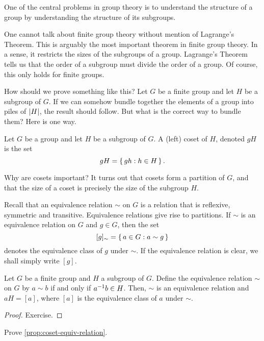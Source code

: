 \documentclass[./main.tex]{subfiles}
\begin{document}
One of the central problems in group theory is to understand the structure of a
group by understanding the structure of its subgroups. 

One cannot talk about finite group theory without mention of Lagrange's Theorem.
This is arguably the most important theorem in finite group theory. In a sense,
it restricts the sizes of the subgroups of a group. Lagrange's Theorem tells us
that the order of a subgroup must divide the order of a group. Of course, this
only holds for finite groups. 

How should we prove something like this? Let $G$ be a finite group and let $H$
be a subgroup of $G$. If we can somehow bundle together the elements of a group
into piles of $\abs{H}$, the result should follow. But what is the correct way
to bundle them? Here is one way.

\begin{definition}[Coset]
\label{def:coset}
Let $G$ be a group and let $H$ be a subgroup of $G$. A (left) coset of $H$,
denoted $gH$ is the set 
\[
    gH = \set{gh: h \in H}.
\]
\end{definition}

Why are cosets important? It turns out that cosets form a partition of $G$, and
that the size of a coset is precisely the size of the subgroup $H$. 

Recall that an equivalence relation $\sim$ on $G$ is a relation that is
reflexive, symmetric and transitive. Equivalence relations give rise to
partitions. If $\sim$ is an equivalence relation on $G$ and $g \in G$, then the
set 
\[
    [g]_\sim = \set{a \in G: a \sim g}
\]
denotes the equivalence class of $g$ under $\sim$. If the equivalence
relation is clear, we shall simply write $[g]$.
\begin{proposition}
\label{prop:coset-equiv-relation}
    Let $G$ be a finite group and $H$ a subgroup of $G$. Define the equivalence
    relation $\sim$ on $G$ by $a \sim b$ if and only if $a^{-1} b \in H$. Then,
    $\sim$ is an equivalence relation and $aH = [a]$, where $[a]$ is the
    equivalence class of $a$ under $\sim$.
\end{proposition}
\begin{proof}
    Exercise.
\end{proof}
\begin{exercise}
    Prove \cref{prop:coset-equiv-relation}.
\end{exercise}
\end{document}
